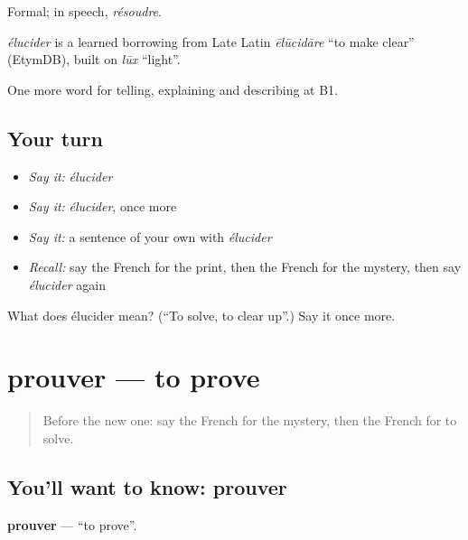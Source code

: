 Formal; in speech, \emph{résoudre}.

\begin{cousinweb}
\emph{élucider} is a learned borrowing from Late Latin \emph{ēlūcidāre} \textquotedblleft{}to make clear\textquotedblright{} (EtymDB), built on \emph{lūx} \textquotedblleft{}light\textquotedblright{}.
\end{cousinweb}

\begin{grammarlens}[title={What you've built}]
One more word for telling, explaining and describing at B1.
\end{grammarlens}

\subsection*{Your turn}
\begin{itemize}
\raggedright
  \item \emph{Say it:} \emph{élucider}
  \item \emph{Say it:} \emph{élucider}, once more
  \item \emph{Say it:} a sentence of your own with \emph{élucider}
  \item \emph{Recall:} say the French for the print, then the French for the mystery, then say \emph{élucider} again
\end{itemize}

\begin{tcolorbox}[breakable,colback=teal!4,colframe=teal!35!black,title={Before you move on}]
What does élucider mean? (\textquotedblleft{}To solve, to clear up\textquotedblright{}.) Say it once more.
\end{tcolorbox}
\section[prouver]{prouver — to prove}

\label{lesson:FR-C293-prouver}



\begin{quote}
Before the new one: say the French for the mystery, then the French for to solve.
\end{quote}

\subsection*{You'll want to know: prouver}
\textbf{prouver} — \textquotedblleft{}to prove\textquotedblright{}.

